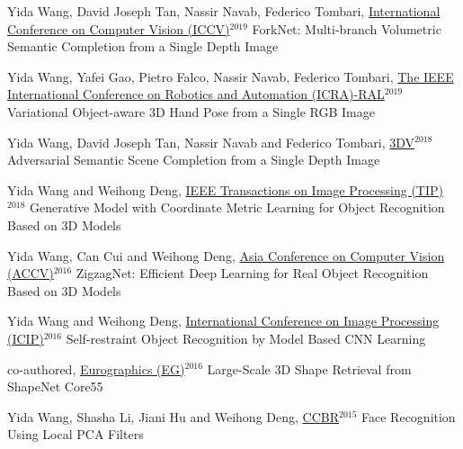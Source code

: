 \begin{cventries}
\begin{enumerate}[label={[\arabic*]}, leftmargin=*]
\item 
\cvpublication
{Yida Wang, David Joseph Tan, Nassir Navab, Federico Tombari, \underline{International Conference on Computer Vision (ICCV)}$^{2019}$} %
{ForkNet: Multi-branch Volumetric Semantic Completion from a Single Depth Image} %
{} %
{} %

\item 
\cvpublication
{Yida Wang, Yafei Gao, Pietro Falco, Nassir Navab, Federico Tombari, \underline{The IEEE International Conference on Robotics and Automation (ICRA)-RAL}$^{2019}$ \href{https://www.youtube.com/watch?v=tSTQ2NTqB4A}{}} %
{Variational Object-aware 3D Hand Pose from a Single RGB Image} %
{} %
{} %

\item 
\cvpublication
{Yida Wang, David Joseph Tan, Nassir Navab and Federico Tombari, \underline{3DV}$^{2018}$ \href{https://www.youtube.com/watch?v=udvBhkupwXE&t=1s}{}} %
{Adversarial Semantic Scene Completion from a Single Depth Image} %
{} %
{} %

\item 
\cvpublication
{Yida Wang and Weihong Deng, \underline{IEEE Transactions on Image Processing (TIP)}$^{2018}$} %
{Generative Model with Coordinate Metric Learning for Object Recognition Based on 3D Models} %
{} %
{} %


\item 
\cvpublication
{Yida Wang, Can Cui and Weihong Deng, \underline{Asia Conference on Computer Vision (ACCV)}$^{2016}$} %
{ZigzagNet: Efficient Deep Learning for Real Object Recognition Based on 3D Models} %
{} %
{} %


\item 
\cvpublication
{Yida Wang and Weihong Deng, \underline{International Conference on Image Processing (ICIP)}$^{2016}$} %
{Self-restraint Object Recognition by Model Based CNN Learning} %
{} %
{} %


\item 
\cvpublication
{co-authored, \underline{Eurographics (EG)}$^{2016}$} %
{Large-Scale 3D Shape Retrieval from ShapeNet Core55} %
{} %
{} %


\item 
\cvpublication
{Yida Wang, Shasha Li, Jiani Hu and Weihong Deng, \underline{CCBR}$^{2015}$} %
{Face Recognition Using Local PCA Filters} %
{} %
{} %
\end{enumerate}


\end{cventries}
